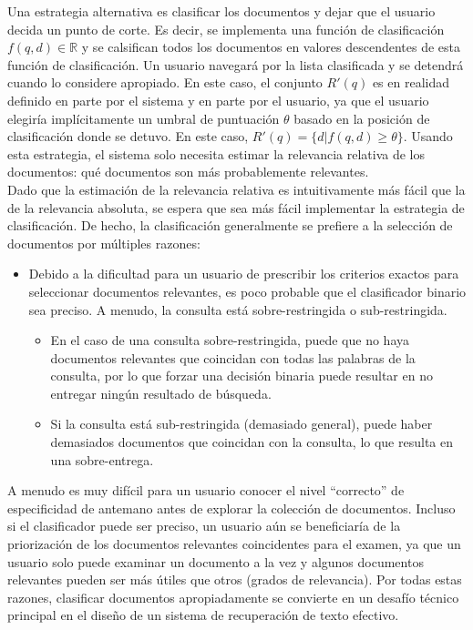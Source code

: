 Una estrategia alternativa es clasificar los documentos y dejar que el usuario decida un punto de corte. Es decir, se implementa una función de clasificación $f(q, d) \in \mathbb{R}$ y se calsifican todos los documentos en valores descendentes de esta función de clasificación. Un usuario navegará por la lista clasificada y se detendrá cuando lo considere apropiado. En este caso, el conjunto $R'(q)$ es en realidad definido en parte por el sistema y en parte por el usuario, ya que el usuario elegiría implícitamente un umbral de puntuación $\theta$ basado en la posición de clasificación donde se detuvo. En este caso, $R'(q) = \{d | f(q, d) \geq \theta\}$. Usando esta estrategia, el sistema solo necesita estimar la relevancia relativa de los documentos: qué documentos son más probablemente relevantes. \\

Dado que la estimación de la relevancia relativa es intuitivamente más fácil que la de la relevancia absoluta, se espera que sea más fácil implementar la estrategia de clasificación. De hecho, la clasificación generalmente se prefiere a la selección de documentos por múltiples razones: 
\begin{itemize}
\item Debido a la dificultad para un usuario de prescribir los criterios exactos para seleccionar documentos relevantes, es poco probable que el clasificador binario sea preciso. A menudo, la consulta está sobre-restringida o sub-restringida. 
\begin{itemize}
\item En el caso de una consulta sobre-restringida, puede que no haya documentos relevantes que coincidan con todas las palabras de la consulta, por lo que forzar una decisión binaria puede resultar en no entregar ningún resultado de búsqueda. 
\item Si la consulta está sub-restringida (demasiado general), puede haber demasiados documentos que coincidan con la consulta, lo que resulta en una sobre-entrega. 
\end{itemize}
\end{itemize}

A menudo es muy difícil para un usuario conocer el nivel ``correcto'' de especificidad de antemano antes de explorar la colección de documentos. Incluso si el clasificador puede ser preciso, un usuario aún se beneficiaría de la priorización de los documentos relevantes coincidentes para el examen, ya que un usuario solo puede examinar un documento a la vez y algunos documentos relevantes pueden ser más útiles que otros (grados de relevancia). Por todas estas razones, clasificar documentos apropiadamente se convierte en un desafío técnico principal en el diseño de un sistema de recuperación de texto efectivo. \\

